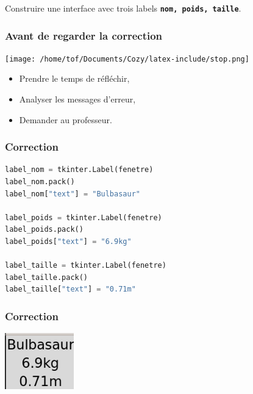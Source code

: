 \documentclass[svgnames,11pt]{beamer}
\begin{document}
\begin{frame}
    \frametitle{}
    \begin{activite}
        Construire une interface avec trois labels \textbf{\texttt{nom, poids, taille}}.
    \end{activite}


\end{frame}
\begin{frame}
    \frametitle{Avant de regarder la correction}
\begin{center}
    \centering
    \texttt{[image: /home/tof/Documents/Cozy/latex-include/stop.png]}
    \end{center}
{\Large
    \begin{itemize}
        \item Prendre le temps de réfléchir,
        \item Analyser les messages d'erreur,
        \item Demander au professeur.
    \end{itemize}
}
\end{frame}
\begin{frame}[fragile]
    \frametitle{Correction}
    \begin{center}
        \begin{lstlisting}[language=Python , basicstyle=\ttfamily\small, xleftmargin=1em, xrightmargin=1em]
label_nom = tkinter.Label(fenetre)
label_nom.pack()
label_nom["text"] = "Bulbasaur"

label_poids = tkinter.Label(fenetre)
label_poids.pack()
label_poids["text"] = "6.9kg"

label_taille = tkinter.Label(fenetre)
label_taille.pack()
label_taille["text"] = "0.71m"
\end{lstlisting}
        \label{CODE}
    \end{center}



\end{frame}
\begin{frame}
    \frametitle{Correction}

    \begin{center}
        \centering
        \includegraphics[width=3cm]{ressources/carte0.png}
        \label{IMG}
    \end{center}

\end{frame}
\end{document}
